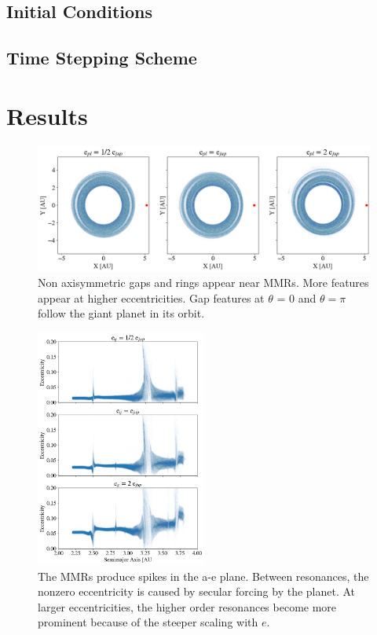 \documentclass[onecolumn]{aastex63}
\begin{document}
\subsection{Initial Conditions}\label{sec:ics}

\subsection{Time Stepping Scheme}\label{sec:timestep}

\section{Results} \label{sec:results}

\begin{figure}
\begin{center}
    \includegraphics[width=\textwidth]{figures/xy.png}
    \caption{Non axisymmetric gaps and rings appear near MMRs. More features appear at higher eccentricities. Gap features
    at $\theta$ = 0 and $\theta = \pi$ follow the giant planet in its orbit.\label{fig:xy}}
\end{center}
\end{figure}

\begin{figure}
\begin{center}
    \includegraphics[width=0.5\textwidth]{figures/ae.png}
    \caption{The MMRs produce spikes in the a-e plane. Between resonances, the nonzero eccentricity is caused by secular
    forcing by the planet. At larger eccentricities, the higher order resonances become more prominent because of the steeper
    scaling with $e$.\label{fig:ae}}
\end{center}
\end{figure}
\end{document}
